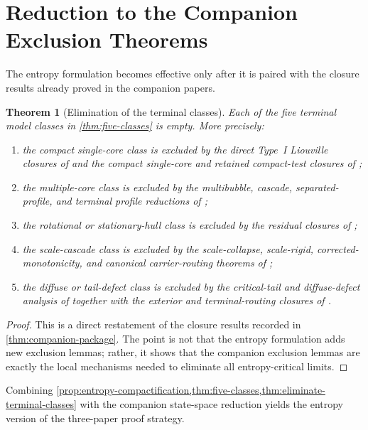 \documentclass[11pt]{amsart}
\numberwithin{equation}{section}
\theoremstyle{plain}
\newtheorem{theorem}{Theorem}[section]
\theoremstyle{definition}
\theoremstyle{remark}
\begin{document}
\section{Reduction to the Companion Exclusion Theorems}
\label{sec:reduction}

The entropy formulation becomes effective only after it is paired with the
closure results already proved in the companion papers.

\begin{theorem}[Elimination of the terminal classes]
\label{thm:eliminate-terminal-classes}
Each of the five terminal model classes in \cref{thm:five-classes} is empty.
More precisely:
\begin{enumerate}[label=\textup{(\roman*)},leftmargin=2.2em]
	\item the compact single-core class is excluded by the direct Type~I
	Liouville closures of \cite{BallesterSetup} and the compact single-core and
	retained compact-test closures of \cite{BallesterTypeII};
	\item the multiple-core class is excluded by the multibubble, cascade,
	separated-profile, and terminal profile reductions of
	\cite{BallesterTypeII};
	\item the rotational or stationary-hull class is excluded by the residual
	closures of \cite{BallesterResidual};
	\item the scale-cascade class is excluded by the scale-collapse, scale-rigid,
	corrected-monotonicity, and canonical carrier-routing theorems of
	\cite{BallesterTypeII};
	\item the diffuse or tail-defect class is excluded by the critical-tail and
	diffuse-defect analysis of \cite{BallesterResidual} together with the
	exterior and terminal-routing closures of \cite{BallesterTypeII}.
\end{enumerate}
\end{theorem}

\begin{proof}
This is a direct restatement of the closure results recorded in
\cref{thm:companion-package}.  The point is not that the entropy formulation
adds new exclusion lemmas; rather, it shows that the companion exclusion lemmas
are exactly the local mechanisms needed to eliminate all entropy-critical
limits.
\end{proof}

Combining \cref{prop:entropy-compactification,thm:five-classes,thm:eliminate-terminal-classes}
with the companion state-space reduction yields the entropy version of the
three-paper proof strategy.
\end{document}
